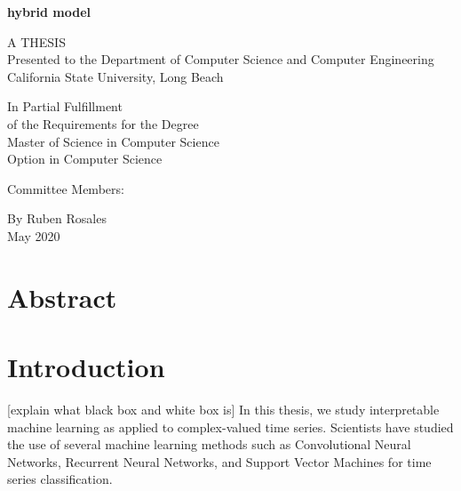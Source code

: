\documentclass{turabian-thesis}
\begin{document}
\frontmatter
\thispagestyle{empty}

\begin{center}
   
   \textbf{hybrid model}
   
   \vspace*{\baselineskip} 
      
   A THESIS \\
   Presented to the Department of Computer Science and Computer Engineering \\
   California State University, Long Beach
   
   \vspace*{\baselineskip} 

   In Partial Fulfillment \\
   of the Requirements for the Degree \\
   Master of Science in Computer Science \\
   Option in Computer Science
   
   \vspace*{\baselineskip} 

   Committee Members: \\
   
   \vspace*{\baselineskip} 

   By Ruben Rosales \\
   May 2020
\end{center}

\pagebreak

\chapter*{Abstract}

\tableofcontents
\listofillustrations

\mainmatter

\chapter{Introduction}




[explain what black box and white box is]
In this thesis, we study interpretable machine learning as applied to complex-valued time series. Scientists have studied the use of several machine learning methods such as Convolutional Neural Networks, Recurrent Neural Networks, and Support Vector Machines for time series classification.
\end{document}

